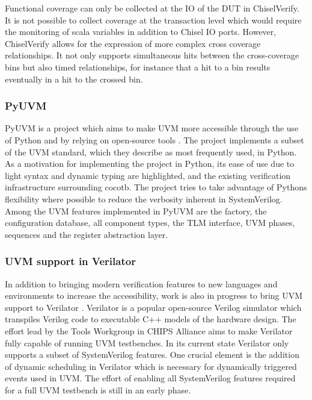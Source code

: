 Functional coverage can only be collected at the IO of the DUT in ChiselVerify. It is not possible to collect
coverage at the transaction level which would require the monitoring of scala variables in addition to Chisel IO
ports. However, ChiselVerify allows for the expression of more complex cross coverage relationships. It not only
supports simultaneous hits between the cross-coverage bins but also timed relationships, for instance that a hit to a
bin results eventually in a hit to the crossed bin.

\subsubsection{PyUVM} %

PyUVM is a project which aims to make UVM more accessible through the use of Python and by relying on open-source
tools \cite{pyuvm}. The project implements a subset of the UVM standard, which they describe as most frequently used,
in Python. As a motivation for implementing the project in Python, its ease of use due to light syntax and dynamic
typing are highlighted, and the existing verification infrastructure surrounding cocotb. The project tries to take
advantage of Pythons flexibility where possible to reduce the verbosity inherent in SystemVerilog. Among the UVM
features implemented in PyUVM are the factory, the configuration database, all component types, the TLM interface,
UVM phases, sequences and the register abstraction layer.

\subsubsection{UVM support in Verilator} %

In addition to bringing modern verification features to new languages and environments to increase the accessibility,
work is also in progress to bring UVM support to Verilator \cite{uvm_verilator}. Verilator is a popular open-source
Verilog simulator which transpiles Verilog code to executable C++ models of the hardware design. The effort lead by
the Tools Workgroup in CHIPS Alliance aims to make Verilator fully capable of running UVM testbenches. In its current
state Verilator only supports a subset of SystemVerilog features. One crucial element is the addition of dynamic
scheduling in Verilator which is necessary for dynamically triggered events used in UVM. The effort of enabling all
SystemVerilog features required for a full UVM testbench is still in an early phase.

